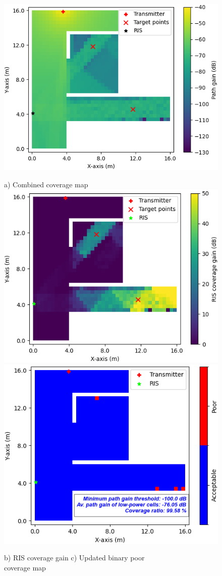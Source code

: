 \documentclass{IEEEoj}
\begin{document}
\begin{figure}
	\centering
	\includegraphics[width=0.8\linewidth]{Sim_Results/Comb_cov_1x2_Gradient.png}
	
	a) Combined coverage map \\[5pt]
	
	\includegraphics[width=0.49\linewidth]{Sim_Results/RIS_cov_gain_1x2_Gradient.png}
	\hfill
	\includegraphics[width=0.48\linewidth]{Sim_Results/New_Binary_Cov_Map_1x2_Gradient.png}
	
	\hspace{10pt} b) RIS coverage gain \hspace{30pt} c) Updated binary poor \\ \hspace{140pt} coverage map \\[5pt]


\end{figure}
\end{document}
